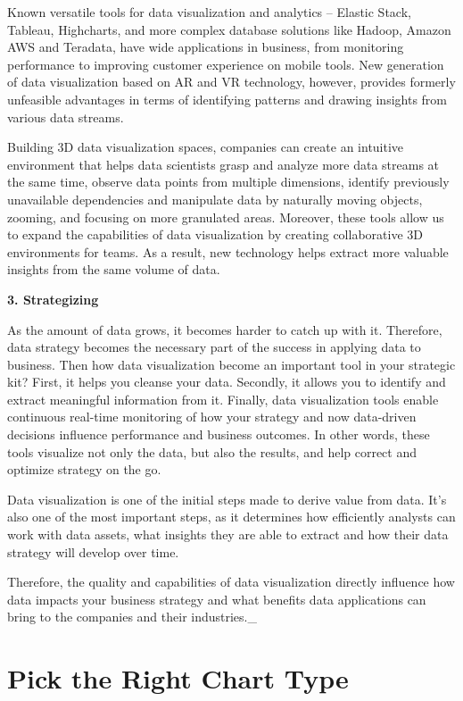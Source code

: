 \documentclass[]{book}
\theoremstyle{definition}
\theoremstyle{definition}
\theoremstyle{definition}
\theoremstyle{remark}
\begin{document}
Known versatile tools for data visualization and analytics -- Elastic
Stack, Tableau, Highcharts, and more complex database solutions like
Hadoop, Amazon AWS and Teradata, have wide applications in business,
from monitoring performance to improving customer experience on mobile
tools. New generation of data visualization based on AR and VR
technology, however, provides formerly unfeasible advantages in terms of
identifying patterns and drawing insights from various data streams.

Building 3D data visualization spaces, companies can create an intuitive
environment that helps data scientists grasp and analyze more data
streams at the same time, observe data points from multiple dimensions,
identify previously unavailable dependencies and manipulate data by
naturally moving objects, zooming, and focusing on more granulated
areas. Moreover, these tools allow us to expand the capabilities of data
visualization by creating collaborative 3D environments for teams. As a
result, new technology helps extract more valuable insights from the
same volume of data.

\textbf{3. Strategizing}

As the amount of data grows, it becomes harder to catch up with it.
Therefore, data strategy becomes the necessary part of the success in
applying data to business. Then how data visualization become an
important tool in your strategic kit? First, it helps you cleanse your
data. Secondly, it allows you to identify and extract meaningful
information from it. Finally, data visualization tools enable continuous
real-time monitoring of how your strategy and now data-driven decisions
influence performance and business outcomes. In other words, these tools
visualize not only the data, but also the results, and help correct and
optimize strategy on the go.

Data visualization is one of the initial steps made to derive value from
data. It's also one of the most important steps, as it determines how
efficiently analysts can work with data assets, what insights they are
able to extract and how their data strategy will develop over time.

Therefore, the quality and capabilities of data visualization directly
influence how data impacts your business strategy and what benefits data
applications can bring to the companies and their industries.\_

\section{Pick the Right Chart Type}\label{pick-the-right-chart-type}
\end{document}
